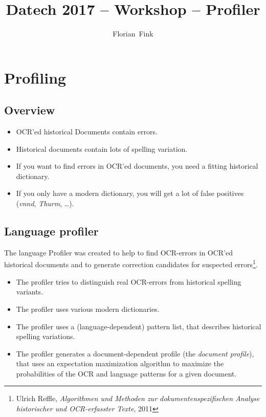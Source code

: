 
\title{Datech 2017 -- \pocoto{} Workshop -- Profiler}
\author{Florian~Fink}



\begin{frame}
	\titlepage
\end{frame}

\section{Profiling}
\subsection{Overview}
\begin{frame}
	\begin{itemize}
		\item OCR'ed historical Documents contain errors.
		\item Historical documents contain lots of spelling variation.
		\item If you want to find errors in OCR'ed documents, you need a fitting
			historical dictionary.
		\item If you only have a modern dictionary, you will get a lot of false
			positives (\emph{vnnd}, \emph{Thurm}, \dots).
	\end{itemize}
\end{frame}

\subsection{Language profiler}
\begin{frame}
	The language Profiler was created to help to find OCR-errors in OCR'ed
	historical documents and to generate correction candidates for suspected
	errors\footnote{Ulrich Reffle, \emph{Algorithmen und Methoden zur
	dokumentenspezifischen Analyse historischer und OCR-erfasster Texte}, 2011}.

	\begin{itemize}
		\item The profiler tries to distinguish real OCR-errors from historical
			spelling variants.
		\item The profiler uses various modern dictionaries.
		\item The profiler uses a (language-dependent) pattern list, that describes
			historical spelling variations.
		\item The profiler generates a document-dependent profile (the \emph{document
			profile}), that uses an expectation maximization algorithm to maximize the
			probabilities of the OCR and language patterns for a given document.
	\end{itemize}
\end{frame}

